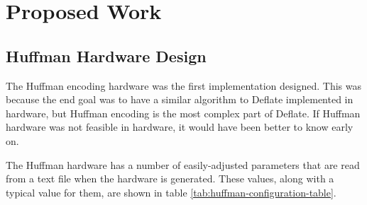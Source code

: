 \documentclass[doublespace,draft,nopageskip]{VTthesis} %
\begin{document}



\chapter{Proposed Work} \label{ch:proposed_work}
\section{Huffman Hardware Design}\label{se:huffman_hardware_design}
The Huffman encoding hardware was the first implementation designed. This was because the end goal was to have a similar algorithm to Deflate implemented in hardware, but Huffman encoding is the most complex part of Deflate. If Huffman hardware was not feasible in hardware, it would have been better to know early on.

The Huffman hardware has a number of easily-adjusted parameters that are read from a text file when the hardware is generated. These values, along with a typical value for them, are shown in table \ref{tab:huffman-configuration-table}.
\end{document}
